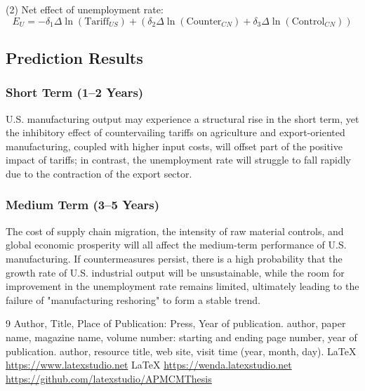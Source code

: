 \documentclass{apmcmthesis}
\begin{document}
(2) Net effect of unemployment rate:
\begin{equation}
E_{U} = 
- \delta_1 \Delta\ln(\text{Tariff}_{US})
+
\left(
\delta_2 \Delta\ln(\text{Counter}_{CN})
+
\delta_3 \Delta\ln(\text{Control}_{CN})
\right)
\end{equation}

\subsection{Prediction Results}
\subsubsection{Short Term (1–2 Years)}

U.S. manufacturing output may experience a structural rise in the short term, yet the inhibitory effect of countervailing tariffs on agriculture and export-oriented manufacturing, coupled with higher input costs, will offset part of the positive impact of tariffs; in contrast, the unemployment rate will struggle to fall rapidly due to the contraction of the export sector.

\subsubsection{Medium Term (3–5 Years)}

The cost of supply chain migration, the intensity of raw material controls, and global economic prosperity will all affect the medium-term performance of U.S. manufacturing. If countermeasures persist, there is a high probability that the growth rate of U.S. industrial output will be unsustainable, while the room for improvement in the unemployment rate remains limited, ultimately leading to the failure of "manufacturing reshoring" to form a stable trend.


\begin{thebibliography}{9}%
 Author, Title, Place of Publication: Press, Year of publication.
 author, paper name, magazine name, volume number: starting and ending
page number, year of publication.
 author, resource title, web site, visit time (year, month, day).
  \LaTeX{} \url{https://www.latexstudio.net}
  \LaTeX{} \url{https://wenda.latexstudio.net}
    \url{https://github.com/latexstudio/APMCMThesis}
\end{thebibliography}
\end{document}
